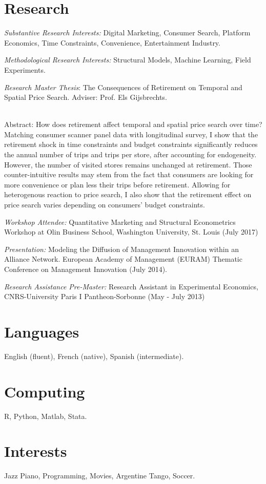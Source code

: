 \documentclass[letterpaper]{article}
\renewenvironment{itemize}{
  \begin{list}{}{
    \setlength{\leftmargin}{1.5em}
  }
}{
  \end{list}
}
\begin{document}
\section*{Research}
\begin{itemize}
\item \textit{Substantive Research Interests:} Digital Marketing, Consumer Search, Platform Economics, Time Constraints, Convenience, Entertainment Industry. 
\item \textit{Methodological Research Interests:} Structural Models, Machine Learning, Field Experiments.
\item \textit{Research Master Thesis}:  The Consequences of Retirement on Temporal and Spatial Price Search. Adviser: Prof. Els Gijsbrechts. \\ \\
\begin{small}
Abstract: How does retirement affect temporal and spatial price search over time? Matching consumer scanner panel data with longitudinal survey, I show that the retirement shock in time constraints and budget constraints significantly reduces the annual number of trips and trips per store, after accounting for endogeneity. However, the number of visited stores remains unchanged at retirement. Those counter-intuitive results may stem from the fact that consumers are looking for more convenience or plan less their trips before retirement. Allowing for heterogenous reaction to price search, I also show that the retirement effect on price search varies depending on consumers' budget constraints.
\end{small}

\item \textit{Workshop Attendee:} Quantitative Marketing and Structural Econometrics Workshop at Olin Business School, Washington University, St. Louis (July 2017)
\item \textit{Presentation:}  Modeling the Diffusion of Management Innovation within an Alliance Network.  European Academy of Management (EURAM) Thematic Conference on Management Innovation (July 2014).
\item \textit{Research Assistance Pre-Master:} Research Assistant in Experimental Economics, CNRS-University Paris I Pantheon-Sorbonne (May - July 2013)
\end{itemize}

\section*{Languages}
English (fluent), French (native), Spanish (intermediate).

\section*{Computing}
R, Python, Matlab, Stata.

\section*{Interests}
Jazz Piano, Programming, Movies, Argentine Tango, Soccer.
\end{document}
